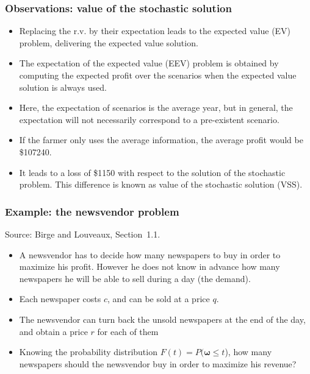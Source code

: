 \documentclass{beamer}
\def\bomega{\boldsymbol\omega}
\def\blue{\color{blue}}
\def\red{\color{red}}
\begin{document}
\begin{frame}
\frametitle{Observations: value of the stochastic solution}

\begin{itemize}
\item
Replacing the r.v. by their expectation 
leads to the expected value (EV) problem, delivering the {\blue expected value solution}.
\item
The {\blue expectation of the expected value (EEV)} problem is obtained by computing the expected profit over the scenarios when the expected value solution is always used.
\item
Here, the expectation of scenarios is the average year, but in general, the expectation will not necessarily correspond to a pre-existent scenario.
\item
If the farmer only uses the average information, the average profit would be \$107240.
\item
It leads to a loss of \$1150 with respect to the solution of the stochastic problem. This difference is known as {\red value of the stochastic solution (VSS)}.
\end{itemize}

\end{frame}


\begin{frame}
\frametitle{Example: the newsvendor problem}

Source: Birge and Louveaux, Section~1.1.

\mbox{}

\begin{itemize}
	\item
	A newsvendor has to decide how many newspapers to buy in order to maximize his profit.
	However he does not know in advance how many newspapers he will be able to sell during a day (the demand).
	\item
	Each newspaper costs $c$, and can be sold at a price $q$.
	\item
	The newsvendor can turn back the unsold newspapers at the end of the day, and obtain a price $r$ for each of them
	\item
	Knowing the probability distribution $F(t) = P(\bomega \leq t$), how many newspapers should the newsvendor buy in order to maximize his revenue?
\end{itemize}

\end{frame}
\end{document}
